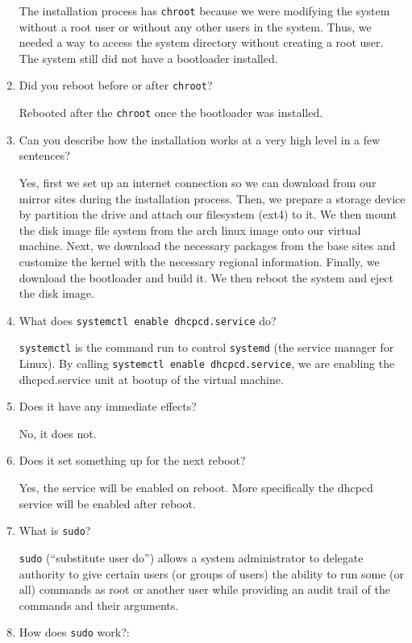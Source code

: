 \documentclass[]{article}
\newcommand{\code}{\texttt}
\begin{document}
\begin{enumerate}
The installation process has \code{chroot} because we were modifying the system
without a root user or without any other users in the system. Thus, we needed a
way to access the system directory without creating a root user. The system
still did not have a bootloader installed.

\item Did you reboot before or after \code{chroot}?

Rebooted after the \code{chroot} once the bootloader was installed.

\item Can you describe how the installation works at a very high level in a few
sentences?

Yes, first we set up an internet connection so we can download from our mirror
sites during the installation process. Then, we prepare a storage device by
partition the drive and attach our filesystem (ext4) to it. We then mount the
disk image file system from the arch linux image onto our virtual machine. Next,
we download the necessary packages from the base sites and customize the kernel
with the necessary regional information. Finally, we download the bootloader and
build it. We then reboot the system and eject the disk image.

\item What does \code{systemctl enable dhcpcd.service} do?

\code{systemctl} is the command run to control \code{systemd} (the service
manager for Linux). By calling \code{systemctl enable dhcpcd.service}, we are
enabling the dhcpcd.service unit at bootup of the virtual machine.

\item Does it have any immediate effects?

No, it does not.

\item Does it set something up for the next reboot?

Yes, the service will be enabled on reboot. More specifically the dhcpcd service
will be enabled after reboot.

\item What is \code{sudo}?

\code{sudo} (``substitute user do'') allows a system administrator to delegate
authority to give certain users (or groups of users) the ability to run some (or
all) commands as root or another user while providing an audit trail of the
commands and their arguments.

\item How does \code{sudo} work?:


\end{enumerate}
\end{document}
